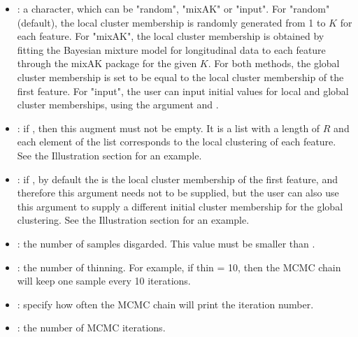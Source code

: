\begin{itemize}
	 \item  {}: a character, which can be "random", "mixAK" or "input".  For "random" (default), the local cluster membership is randomly generated from 1 to $K$ for each feature.  For "mixAK", the local cluster membership is obtained by fitting the Bayesian mixture model for longitudinal data to each feature through the mixAK package for the given $K$.  For both methods, the global cluster membership is set to be equal to the local cluster membership of the first feature. For "input", the user can input initial values for local and global cluster memberships, using the argument  and . 
	\item  {}: if  , then this augment must not be empty. It is a list with a length of $R$ and each element of the list corresponds to the local clustering of each feature. See the Illustration section for an example.
	\item  {}: if  , by default the  is the local cluster membership of the first feature, and therefore this argument needs not to be supplied, but the user can also use this argument to supply a different initial cluster membership for the global clustering. See the Illustration section for an example.
	\item  {}: the number of samples disgarded. This value must be smaller than .
	\item  {}: the number of thinning. For example, if thin = 10, then the MCMC chain will keep one sample every 10 iterations. 
	\item  {}: specify how often the MCMC chain will print the iteration number. 
	\item  {}: the number of MCMC iterations. 
\end{itemize}

